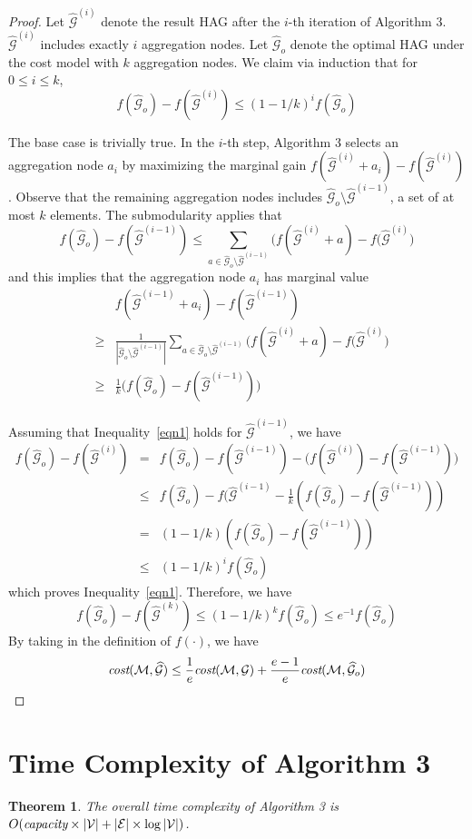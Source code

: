 \documentclass{article}
\newcommand{\er}[1]{\mbox{\rm\em #1}}
\newcommand{\xg}{HAG\xspace}
\newcommand{\mw}[1] {\mathcal{\widehat{#1}}}
\newcommand{\m}[1] {\mathcal{#1}}
\newtheorem{theorem}{Theorem}
\begin{document}
\begin{proof}
Let $\mw{G}^{(i)}$ denote the result \xg after the $i$-th iteration of Algorithm 3. $\mw{G}^{(i)}$ includes exactly $i$ aggregation nodes. Let $\mw{G}_o$ denote the optimal \xg under the cost model with $k$ aggregation nodes. We claim via induction that for $0\leq i \leq k$,
\begin{equation}
\label{eqn1}
f(\mw{G}_o) - f(\mw{G}^{(i)}) \leq (1 - 1/k)^i f(\mw{G}_o) 
\end{equation}

The base case is trivially true. In the $i$-th step, Algorithm 3 selects an aggregation node $a_i$ by maximizing the marginal gain $f(\mw{G}^{(i)} + a_i) - f(\mw{G}^{(i)})$. Observe that the remaining aggregation nodes includes $\mw{G}_o \setminus \mw{G}^{(i-1)}$, a set of at most $k$ elements. The submodularity applies that
$$
f(\mw{G}_o) - f(\mw{G}^{(i-1)}) \leq \sum_{a \in \mw{G}_o \setminus \mw{G}^{(i-1)}} \big( f(\mw{G}^{(i)} + a) - f(\mw{G}^{(i)} \big)
$$
and this implies that the aggregation node $a_i$ has marginal value
\begin{eqnarray*}
& & f(\mw{G}^{(i-1)} + a_i) - f(\mw{G}^{(i-1)}) \\
&\geq &\frac{1}{|\mw{G}_o \setminus \mw{G}^{(i-1)}|}\sum_{a\in \mw{G}_o \setminus \mw{G}^{(i-1)}}{\big( f(\mw{G}^{(i)} + a) - f(\mw{G}^{(i)} \big)} \\
&\geq & \frac{1}{k} \big( f(\mw{G}_o) - f(\mw{G}^{(i-1)})\big)
\end{eqnarray*}

Assuming that Inequality~\ref{eqn1} holds for $\mw{G}^{(i-1)}$, we have
\begin{eqnarray*}
f(\mw{G}_o) - f(\mw{G}^{(i)}) & = &f(\mw{G}_o) - f(\mw{G}^{(i-1)}) - \big( f(\mw{G}^{(i)}) - f(\mw{G}^{(i-1)}) \big)\\
& \leq & f(\mw{G}_o) - f(\mw{G}^{(i-1)} - \frac{1}{k} (f(\mw{G}_o) - f(\mw{G}^{(i-1)})) \\
& = & (1 - 1/k) (f(\mw{G}_o) - f(\mw{G}^{(i-1)})) \\
& \leq & (1-1/k)^i f(\mw{G}_o)
\end{eqnarray*}
which proves Inequality~\ref{eqn1}. Therefore, we have
$$
f(\mw{G}_o) - f(\mw{G}^{(k)}) \leq (1-1/k)^k f(\mw{G}_o) \leq e^{-1} f(\mw{G}_o)
$$
By taking in the definition of $f(\cdot)$, we have
$$
\er{cost}(\m{M}, \mw{G}) \leq \frac{1}{e} \er{cost}(\m{M}, \m{G}) + \frac{e-1}{e} \er{cost}(\m{M}, \mw{G}_o)
$$
\end{proof}

\section{Time Complexity of Algorithm 3}
\begin{theorem}
The overall time complexity of Algorithm 3 is $O(\er{capacity} \times |\m{V}| + |\m{E}| \times \log|\m{V}|)$.
\end{theorem}
\end{document}
